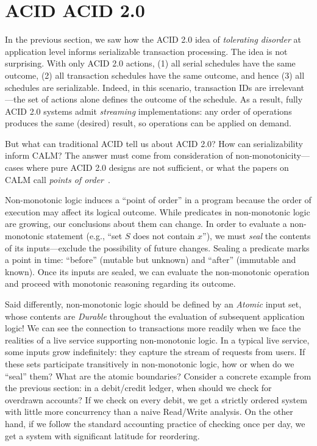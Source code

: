 \documentclass{sig-alternate}
\begin{document}
\section{ACID ACID 2.0}
In the previous section, we saw how the ACID 2.0 idea of \emph{tolerating
  disorder} at application level informs serializable transaction
processing. The idea is not surprising.  With only ACID 2.0 actions, (1) all
serial schedules have the same outcome, (2) all transaction schedules have the
same outcome, and hence (3) all schedules are serializable.  Indeed, in this
scenario, transaction IDs are irrelevant---the set of actions alone defines the
outcome of the schedule.  As a result, fully ACID 2.0 systems admit
\emph{streaming} implementations: any order of operations produces the same
(desired) result, so operations can be applied on demand.

But what can traditional ACID tell us about ACID 2.0?  How can serializability
inform CALM?  The answer must come from consideration of
non-monotonicity---cases where pure ACID 2.0 designs are not sufficient, or what
the papers on CALM call \emph{points of order}~\cite{Alvaro2011}.

Non-monotonic logic induces a ``point of order'' in a program because the order of execution may affect its logical outcome.  
While predicates in non-monotonic logic are growing, our conclusions about them can change.  
In order to evaluate a non-monotonic statement (e.g., ``set $S$ does not contain $x$''), we must \emph{seal} the 
contents of its inputs---exclude the possibility of future changes.  
Sealing a predicate marks a point in time: ``before'' (mutable but unknown) and ``after'' (immutable and known).  
Once its inputs are sealed, we can evaluate the non-monotonic operation and proceed with monotonic reasoning regarding its outcome.

Said differently, non-monotonic logic should be defined by an \emph{Atomic} input set, whose contents are \emph{Durable} throughout the evaluation of subsequent application logic!  We can see the connection to transactions more readily when we face the realities of a live service supporting non-monotonic logic.  In a typical live service, some inputs grow indefinitely: they capture the stream of requests from users.  If these sets participate transitively in non-monotonic logic, how or when do we ``seal'' them?  What are the atomic boundaries?  Consider a concrete example from the previous section: in a debit/credit ledger, when should we check for overdrawn accounts?  If we check on every debit, we get a strictly ordered system with little more concurrency than a naive Read/Write analysis.  On the other hand, if we follow the standard accounting practice of checking once per day, we get a system with significant latitude for reordering. 
\end{document}
